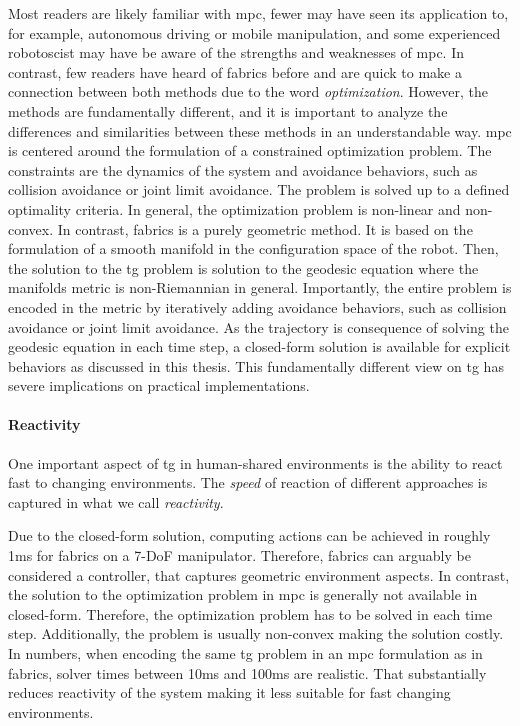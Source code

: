 Most readers are likely familiar with \acl{mpc}, fewer may have seen its application
to, for example, autonomous driving or mobile manipulation, and some 
experienced robotoscist may have be aware of the strengths and weaknesses of
\ac{mpc}. In contrast, few readers have heard of \acf{fabrics} before and are 
quick to make a connection between both methods due to the word
\textit{optimization}. However, the methods are
fundamentally different,
and it is important to analyze the differences and similarities between
these methods in an understandable way.
\ac{mpc} is centered around the
formulation of a constrained optimization problem. The constraints are
the dynamics of the system and avoidance behaviors, such as collision avoidance
or joint limit avoidance. The problem is solved up to a defined optimality 
criteria. In general, the optimization problem is non-linear and non-convex.
In contrast, \ac{fabrics} is a purely geometric method. It is based on the
formulation of a smooth manifold in the configuration space of the robot.
Then, the solution to the \ac{tg} problem is solution to the geodesic equation
where the manifolds metric is non-Riemannian in general. Importantly, the entire
problem is encoded in the metric by iteratively adding avoidance
behaviors, such as collision avoidance or joint limit avoidance. As the
trajectory is consequence of solving the geodesic equation in each time step, a
closed-form solution is available for explicit behaviors as discussed in this
thesis.
This fundamentally different view on \ac{tg} has severe implications on
practical implementations.

\paragraph{Reactivity}
\label{par:discussion_reactivity}

One important aspect of \ac{tg} in human-shared environments is the ability to
react fast to changing environments. The \textit{speed} of reaction
of different approaches is captured in what we call \textit{reactivity}.

Due to the closed-form solution, computing actions can be
achieved in roughly 1ms for \ac{fabrics} on a 7-DoF
manipulator. Therefore, \ac{fabrics} can arguably be
considered a controller, that captures geometric environment
aspects. In contrast, the solution to the optimization
problem in \ac{mpc} is generally not available in
closed-form. Therefore, the optimization problem has to be 
solved in each time step. Additionally, the problem is
usually non-convex making the solution costly. In numbers,
when encoding the same \ac{tg} problem in an \ac{mpc}
formulation as in \ac{fabrics}, solver times between 10ms
and 100ms are realistic. That substantially reduces
reactivity of the system making it less suitable for fast
changing environments.


